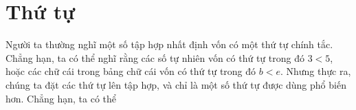 \section{Thứ tự}

Người ta thường nghĩ một số tập hợp nhất định vốn có một thứ tự chính tắc. Chẳng hạn, ta có thể nghĩ rằng các số tự nhiên vốn có thứ tự trong đó $3<5$, hoặc các chữ cái trong bảng chữ cái vốn có thứ tự trong đó $b<e$. Nhưng thực ra, chúng ta đặt các thứ tự lên tập hợp, và chỉ là một số thứ tự được dùng phổ biến hơn. Chẳng hạn, ta có thể
